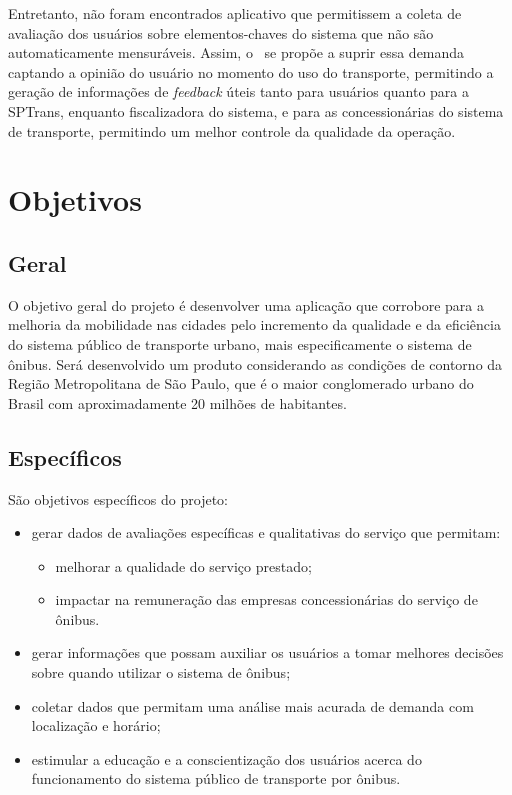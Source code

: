 Entretanto, não foram encontrados aplicativo que permitissem a coleta de avaliação dos usuários sobre elementos-chaves do sistema que não são automaticamente mensuráveis. Assim, o \trilhasp~se propõe a suprir essa demanda captando a opinião do usuário no momento do uso do transporte, permitindo a geração de informações de \textit{feedback} úteis tanto para usuários quanto para a SPTrans, enquanto fiscalizadora do sistema, e para as concessionárias do sistema de transporte, permitindo um melhor controle da qualidade da operação.

\section{Objetivos}\label{sec:objetivos}
\subsection{Geral}\label{subsec:objGerais}
O objetivo geral do projeto é desenvolver uma aplicação que corrobore para a melhoria da mobilidade nas cidades pelo incremento da qualidade e da eficiência do sistema público de transporte urbano, mais especificamente o sistema de ônibus. Será desenvolvido um produto considerando as condições de contorno da Região Metropolitana de São Paulo, que é o maior conglomerado urbano do Brasil com aproximadamente 20 milhões de habitantes.

\clearpage
\subsection{Específicos}\label{subsec:objEspec}
São objetivos específicos do projeto:
\begin{itemize}
\item gerar dados de avaliações específicas e qualitativas do serviço que permitam: \begin{itemize}
\item melhorar a qualidade do serviço prestado;
\item impactar na remuneração das empresas concessionárias do serviço de ônibus.
\end{itemize}
\item gerar informações que possam auxiliar os usuários a tomar melhores decisões sobre quando utilizar o sistema de ônibus;
\item coletar dados que permitam uma análise mais acurada de demanda com localização e horário;
\item estimular a educação e a conscientização dos usuários acerca do funcionamento do sistema público de transporte por ônibus.
\end{itemize}
	
